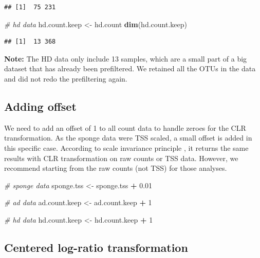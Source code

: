 \documentclass[]{book}
\newenvironment{Shaded}{\begin{snugshade}}{\end{snugshade}}
\newcommand{\KeywordTok}[1]{\textcolor[rgb]{0.13,0.29,0.53}{\textbf{#1}}}
\newcommand{\DecValTok}[1]{\textcolor[rgb]{0.00,0.00,0.81}{#1}}
\newcommand{\FloatTok}[1]{\textcolor[rgb]{0.00,0.00,0.81}{#1}}
\newcommand{\StringTok}[1]{\textcolor[rgb]{0.31,0.60,0.02}{#1}}
\newcommand{\CommentTok}[1]{\textcolor[rgb]{0.56,0.35,0.01}{\textit{#1}}}
\newcommand{\OperatorTok}[1]{\textcolor[rgb]{0.81,0.36,0.00}{\textbf{#1}}}
\newcommand{\NormalTok}[1]{#1}
\begin{document}
\begin{verbatim}
## [1]  75 231
\end{verbatim}

\begin{Shaded}
\begin{Highlighting}[]
\CommentTok{# hd data}
\NormalTok{hd.count.keep <-}\StringTok{ }\NormalTok{hd.count}
\KeywordTok{dim}\NormalTok{(hd.count.keep)}
\end{Highlighting}
\end{Shaded}

\begin{verbatim}
## [1]  13 368
\end{verbatim}

\textbf{Note:} The HD data only include 13 samples, which are a small
part of a big dataset that has already been prefiltered. We retained all
the OTUs in the data and did not redo the prefiltering again.

\subsection{Adding offset}\label{adding-offset}

We need to add an offset of 1 to all count data to handle zeroes for the
CLR transformation. As the sponge data were TSS scaled, a small offset
is added in this specific case. According to scale invariance principle
\citep{aitchison1986statistical}, it returns the same results with CLR
transformation on raw counts or TSS data. However, we recommend starting
from the raw counts (not TSS) for those analyses.

\begin{Shaded}
\begin{Highlighting}[]
\CommentTok{# sponge data}
\NormalTok{sponge.tss <-}\StringTok{ }\NormalTok{sponge.tss }\OperatorTok{+}\StringTok{ }\FloatTok{0.01}

\CommentTok{# ad data}
\NormalTok{ad.count.keep <-}\StringTok{ }\NormalTok{ad.count.keep }\OperatorTok{+}\StringTok{ }\DecValTok{1}

\CommentTok{# hd data}
\NormalTok{hd.count.keep <-}\StringTok{ }\NormalTok{hd.count.keep }\OperatorTok{+}\StringTok{ }\DecValTok{1}
\end{Highlighting}
\end{Shaded}

\subsection{Centered log-ratio
transformation}\label{centered-log-ratio-transformation}
\end{document}
